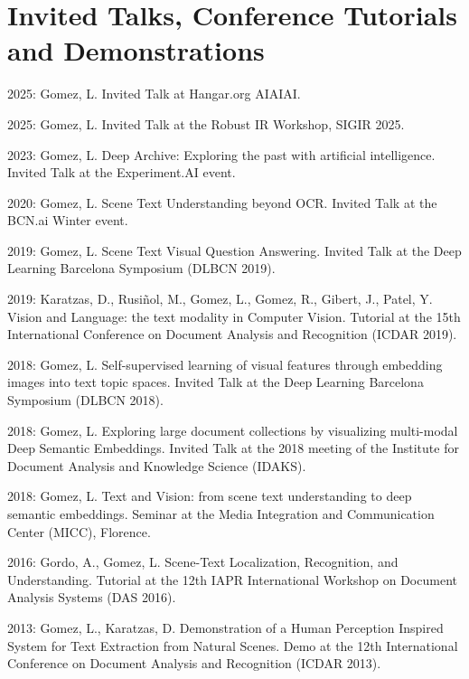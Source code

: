 \documentclass[11pt]{article}
\newenvironment{entries}{%
  \begin{list}{}{\setlength{\leftmargin}{3em}\setlength{\itemindent}{-1.5em}%
    \setlength{\itemsep}{0.35em}\setlength{\parsep}{0pt}\setlength{\topsep}{0.2em}}}%
  {\end{list}}
\begin{document}
\section*{Invited Talks, Conference Tutorials and Demonstrations}
\begin{entries}
\item 2025: Gomez, L. Invited Talk at Hangar.org AIAIAI.
\item 2025: Gomez, L. Invited Talk at the Robust IR Workshop, SIGIR 2025.
\item 2023: Gomez, L. Deep Archive: Exploring the past with artificial intelligence. Invited Talk at the Experiment.AI event.
\item 2020: Gomez, L. Scene Text Understanding beyond OCR. Invited Talk at the BCN.ai Winter event.
\item 2019: Gomez, L. Scene Text Visual Question Answering. Invited Talk at the Deep Learning Barcelona Symposium (DLBCN 2019).
\item 2019: Karatzas, D., Rusiñol, M., Gomez, L., Gomez, R., Gibert, J., Patel, Y. Vision and Language: the text modality in Computer Vision. Tutorial at the 15th International Conference on Document Analysis and Recognition (ICDAR 2019).
\item 2018: Gomez, L. Self-supervised learning of visual features through embedding images into text topic spaces. Invited Talk at the Deep Learning Barcelona Symposium (DLBCN 2018).
\item 2018: Gomez, L. Exploring large document collections by visualizing multi-modal Deep Semantic Embeddings. Invited Talk at the 2018 meeting of the Institute for Document Analysis and Knowledge Science (IDAKS).
\item 2018: Gomez, L. Text and Vision: from scene text understanding to deep semantic embeddings. Seminar at the Media Integration and Communication Center (MICC), Florence.
\item 2016: Gordo, A., Gomez, L. Scene-Text Localization, Recognition, and Understanding. Tutorial at the 12th IAPR International Workshop on Document Analysis Systems (DAS 2016).
\item 2013: Gomez, L., Karatzas, D. Demonstration of a Human Perception Inspired System for Text Extraction from Natural Scenes. Demo at the 12th International Conference on Document Analysis and Recognition (ICDAR 2013).
\end{entries}

\end{document}
